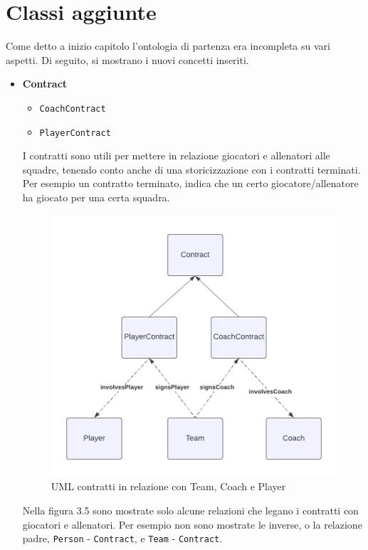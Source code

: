 \documentclass[11pt]{report} %
\begin{document}
\newpage


 \section{Classi aggiunte}

Come detto a inizio capitolo l'ontologia di partenza era incompleta su vari aspetti. Di seguito, si mostrano i nuovi concetti inseriti.

\begin{itemize}[leftmargin=*]
    \item \textbf{Contract}
    \begin{itemize}[leftmargin=2em]
        \item \texttt{CoachContract}
        \item \texttt{PlayerContract}
    \end{itemize}
  

     I contratti sono utili per mettere in relazione giocatori e allenatori alle squadre, tenendo conto anche di una storicizzazione con i contratti terminati. Per esempio un contratto terminato, indica che un certo giocatore/allenatore ha giocato per una certa squadra.
  
    \begin{figure}[H]
        \centering
        \includegraphics[width=0.8\linewidth]{CONTRACT.png}
        \caption{UML contratti in relazione con Team, Coach e Player}
    \end{figure}

    Nella figura 3.5 sono mostrate solo alcune relazioni che legano i contratti con giocatori e allenatori. Per esempio non sono mostrate le inverse, o la relazione padre,  \texttt{Person} - \texttt{Contract}, e \texttt{Team} - \texttt{Contract}. 


\end{itemize}
\end{document}
